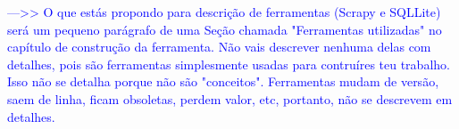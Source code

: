 \documentclass[]{ufsc-thesis}
\begin{document}
\pretextual%
\imprimircapa%

\imprimirfolhaderosto%

\afterpage{\null\newpage}



\begin{KeepFromToc}
    \tableofcontents
\end{KeepFromToc}




\textcolor{blue}{--->> O que estás propondo para descrição de ferramentas (Scrapy e SQLLite) será um pequeno parágrafo de uma Seção chamada "Ferramentas utilizadas" no capítulo de construção da ferramenta. Não vais descrever nenhuma delas com detalhes, pois são ferramentas simplesmente usadas para contruíres teu trabalho. Isso não se detalha porque não são "conceitos". Ferramentas mudam de versão, saem de linha, ficam obsoletas, perdem valor, etc, portanto, não se descrevem em detalhes.}









\end{document}
